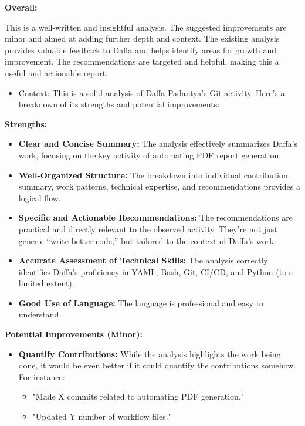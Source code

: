 \documentclass{article}
\begin{document}
\begin{itemize}
\textbf{Overall:}

This is a well-written and insightful analysis. The suggested improvements are minor and aimed at adding further depth and context.  The existing analysis provides valuable feedback to Daffa and helps identify areas for growth and improvement. The recommendations are targeted and helpful, making this a useful and actionable report.

    \begin{itemize}
    \item Context: This is a solid analysis of Daffa Padantya's Git activity.  Here's a breakdown of its strengths and potential improvements:
\end{itemize}

    \textbf{Strengths:}
\begin{itemize}
    \item \textbf{Clear and Concise Summary:}  The analysis effectively summarizes Daffa's work, focusing on the key activity of automating PDF report generation.
    \item \textbf{Well-Organized Structure:}  The breakdown into individual contribution summary, work patterns, technical expertise, and recommendations provides a logical flow.
    \item \textbf{Specific and Actionable Recommendations:}  The recommendations are practical and directly relevant to the observed activity.  They're not just generic ``write better code,'' but tailored to the context of Daffa's work.
    \item \textbf{Accurate Assessment of Technical Skills:}  The analysis correctly identifies Daffa's proficiency in YAML, Bash, Git, CI/CD, and Python (to a limited extent).
    \item \textbf{Good Use of Language:}  The language is professional and easy to understand.
\end{itemize}
\textbf{Potential Improvements (Minor):}

\begin{itemize}
    \item \textbf{Quantify Contributions:} While the analysis highlights the work being done, it would be even better if it could quantify the contributions somehow. For instance:
        \begin{itemize}
            \item "Made X commits related to automating PDF generation."
            \item  "Updated Y number of workflow files."
        \end{itemize}


\end{itemize}
\end{itemize}
\end{document}
